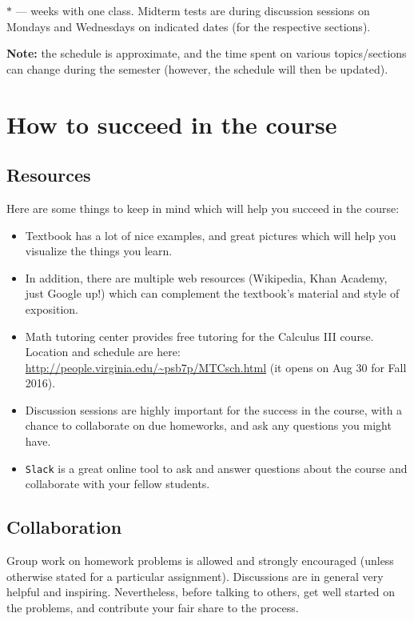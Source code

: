 \documentclass[oneside,11pt]{amsart}
\begin{document}
\vspace{5pt}

$*$ --- weeks with one class. Midterm tests are during discussion sessions on Mondays and Wednesdays on indicated dates (for the respective sections).

\textbf{Note:} the schedule is approximate, and the time spent on various topics/sections can change during the semester (however, the schedule will then be updated).

\section{How to succeed in the course}

\subsection{Resources}

Here are some things to keep in mind which will help you succeed in the course:
\begin{itemize}
	\item Textbook has a lot of nice examples, and great pictures which will help you visualize the things you learn.
	\item In addition, there are multiple web resources (Wikipedia, Khan Academy, just Google up!) which can complement the textbook's material and style of exposition.
	\item Math tutoring center provides free tutoring for the Calculus III course. Location and schedule are here: \url{http://people.virginia.edu/~psb7p/MTCsch.html} (it opens on Aug 30 for Fall 2016).
	\item 
	Discussion sessions are highly important for the success in the course, with a chance to collaborate on due homeworks, and ask any questions you might have.
	\item \texttt{Slack} is a great online tool to ask and answer questions about the course and collaborate with your fellow students.
\end{itemize}

\subsection{Collaboration}

Group work on homework problems is allowed and strongly encouraged (unless otherwise stated for a particular assignment). Discussions are in general very helpful and inspiring. Nevertheless, before talking to others, get well started on the problems, and contribute your fair share to the process. 
\end{document}
